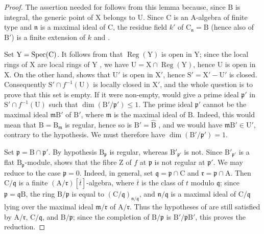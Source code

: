 \begin{proof}
The assertion needed for  follows from this lemma because, since $\mathrm{B}$ is integral, the generic point of $\mathrm{X}$ belongs to $\mathrm{U}$.
Since $\mathrm{C}$ is an $\mathrm{A}$-algebra of finite type and $\mathfrak{n}$ is a maximal ideal of $\mathrm{C}$, the residue field $k'$ of $\mathrm{C}_\mathfrak{n}=\mathrm{B}$ (hence also of $\mathrm{B}'$) is a finite extension of $k$  and .

Set $\mathrm{Y}=\operatorname{Spec}(\mathrm{C})$. It follows from  that $\operatorname{Reg}(\mathrm{Y})$ is open in $\mathrm{Y}$; since the local rings of $\mathrm{X}$ are local rings of $\mathrm{Y}$ , we have $\mathrm{U}=\mathrm{X}\cap\operatorname{Reg}(\mathrm{Y})$, hence $\mathrm{U}$ is open in $\mathrm{X}$. On the other hand,  shows that $\mathrm{U}'$ is open in $\mathrm{X}'$, hence $\mathrm{S}'=\mathrm{X}'-\mathrm{U}'$ is closed. Consequently $\mathrm{S}'\cap f^{-1}(\mathrm{U})$ is locally closed in $\mathrm{X}'$, and the whole question is to prove that this set is empty.
If it were non-empty,  would give a prime ideal $\mathfrak{p}'$ in $\mathrm{S}'\cap f^{-1}(\mathrm{U})$ such that $\dim(\mathrm{B}'/\mathfrak{p}')\leqslant 1$.
The prime ideal $\mathfrak{p}'$ cannot be the maximal ideal $\mathfrak{m}\mathrm{B}'$ of $\mathrm{B}'$, where $\mathfrak{m}$ is the maximal ideal of $\mathrm{B}$. Indeed, this would mean that $\mathrm{B}=\mathrm{B}_\mathfrak{m}$ is regular, hence so is $\mathrm{B}'=\widehat{\mathrm{B}}$ , and we would have $\mathfrak{m}\mathrm{B}'\in\mathrm{U}'$, contrary to the hypothesis. We must therefore have $\dim(\mathrm{B}'/\mathfrak{p}')=1$.

Set $\mathfrak{p}=\mathrm{B}\cap\mathfrak{p}'$. By hypothesis $\mathrm{B}_\mathfrak{p}$ is regular, whereas $\mathrm{B}'_{\mathfrak{p}'}$ is not. Since $\mathrm{B}'_{\mathfrak{p}'}$ is a flat $\mathrm{B}_\mathfrak{p}$-module,  shows that the fibre $\mathrm{Z}$ of $f$ at $\mathfrak{p}$ is not regular at $\mathfrak{p}'$.
We may reduce to the case $\mathfrak{p}=0$. Indeed, in general, set $\mathfrak{q}=\mathfrak{p}\cap\mathrm{C}$ and $\mathfrak{r}=\mathfrak{p}\cap\mathrm{A}$. Then $\mathrm{C}/\mathfrak{q}$ is a finite $(\mathrm{A}/\mathfrak{r})[\bar{t}]$-algebra, where $\bar{t}$ is the class of $t$ modulo $\mathfrak{q}$; since $\mathfrak{p}=\mathfrak{q}\mathrm{B}$, the ring $\mathrm{B}/\mathfrak{p}$ is equal to $(\mathrm{C}/\mathfrak{q})_{\mathfrak{n}/\mathfrak{q}}$, and $\mathfrak{n}/\mathfrak{q}$ is a maximal ideal of $\mathrm{C}/\mathfrak{q}$ lying over the maximal ideal $\mathfrak{m}/\mathfrak{r}$ of $\mathrm{A}/\mathfrak{r}$. Thus the hypotheses of  are still satisfied by $\mathrm{A}/\mathfrak{r}$, $\mathrm{C}/\mathfrak{q}$, and $\mathrm{B}/\mathfrak{p}$; since the completion of $\mathrm{B}/\mathfrak{p}$ is $\mathrm{B}'/\mathfrak{p}\mathrm{B}'$, this proves the reduction.


\end{proof}
